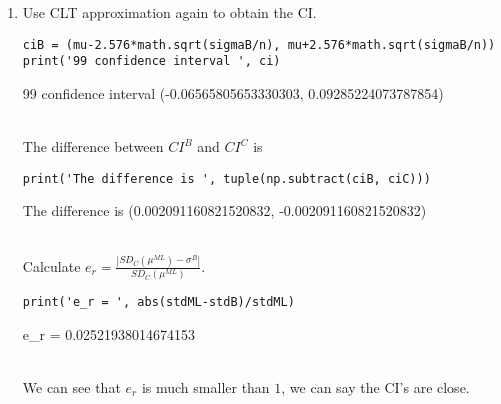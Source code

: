 \documentclass[preprint,12pt]{elsarticle}
\begin{document}
\begin{enumerate}[label=\alph*]
        \item Use CLT approximation again to obtain the CI.
        \begin{lstlisting}
ciB = (mu-2.576*math.sqrt(sigmaB/n), mu+2.576*math.sqrt(sigmaB/n))
print('99 confidence interval ', ci)
        \end{lstlisting}
        \begin{spverbatim}
99 confidence interval  (-0.06565805653330303, 0.09285224073787854)
        \end{spverbatim}
        \\ The difference between $CI^B$ and $CI^C$ is 
        \begin{lstlisting}
print('The difference is ', tuple(np.subtract(ciB, ciC)))            
        \end{lstlisting}
        \begin{spverbatim}
The difference is  (0.002091160821520832, -0.002091160821520832)
        \end{spverbatim}
        \\ Calculate $e_r=\frac{|SD_C(\mu^{ML})-\sigma^{B}|}{SD_C(\mu^{ML})}$.
        \begin{lstlisting}
print('e_r = ', abs(stdML-stdB)/stdML)
        \end{lstlisting}
        \begin{spverbatim}
e_r =  0.02521938014674153
        \end{spverbatim}
        \\ We can see that $e_r$ is much smaller than $1$, we can say the CI's
        are close.
    \end{enumerate}
\end{document}
